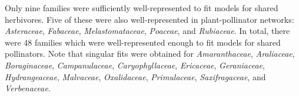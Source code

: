 \documentclass[12pt]{article}
\begin{document}
\begin{spacing}{1.0}
    Only nine families were sufficiently well-represented to fit models for shared herbivores. Five of these were also well-represented in plant-pollinator networks: \emph{Asteraceae}, \emph{Fabaceae}, \emph{Melastomataceae}, \emph{Poaceae}, and \emph{Rubiaceae}. In total, there were 48 families which were well-represented enough to fit models for shared pollinators. Note that singular fits were obtained for \emph{Amaranthaceae}, \emph{Araliaceae}, \emph{Boraginaceae},
    \emph{Campanulaceae}, \emph{Caryophyllaceae}, \emph{Ericaceae}, \emph{Geraniaceae}, 
    \emph{Hydrangeaceae}, \emph{Malvaceae}, \emph{Oxalidaceae}, \emph{Primulaceae}, 
    \emph{Saxifragaceae}, and \emph{Verbenaceae}. 
  



\end{spacing}

\clearpage

\newpage

\renewcommand*{\bibfont}{\raggedright}

\end{document}
